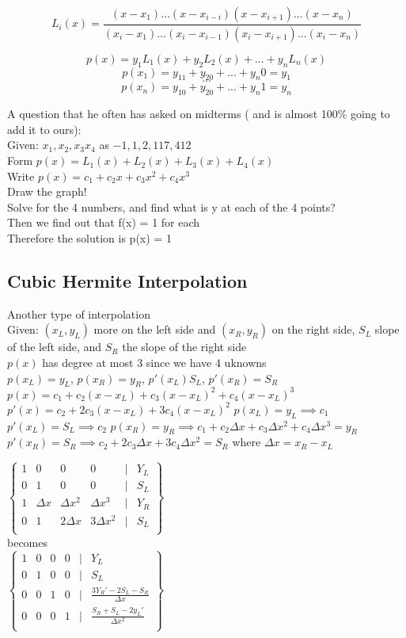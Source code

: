 \documentclass[12pt]{article}
\begin{document}
	$$L_i(x) = \frac{(x-x_1)...(x-x_{i-i})(x-x_{i+1})...(x-x_n)}{(x_i-x_1)...(x_i-x_{i-1})(x_i-x_{i+1})...(x_i-x_n)}$$
	
	$$p(x) = y_1L_1(x) + y_2L_2(x) + ... + y_nL_n(x)$$
	$$p(x_1) = y_11 + y_20 + ... + y_n0 = y_1$$
	$$...$$
	$$p(x_n) = y_10 + y_20 + ... + y_n1 = y_n$$
	
	A question that he often has asked on midterms ( and is almost 100\% going to add it to ours):\\
	Given: $x_1,x_2,x_3x_4$ as $-1,1,2,117,412$\\
	Form $p(x) = L_1(x) + L_2(x) + L_3(x) + L_4(x)$\\
	Write $p(x) = c_1 + c_2x + c_3x^2 + c_4x^3$\\
	
	Draw the graph!\\
	Solve for the 4 numbers, and find what is y at each of the 4 points?\\
	Then we find out that f(x) = 1 for each\\
	Therefore the solution is p(x) = 1\\
	
	\subsection*{Cubic Hermite Interpolation}
	Another type of interpolation\\
	
	Given: $(x_L, y_L)$ more on the left side and $(x_R, y_R)$ on the right side, $S_L$ slope of the left side, and $S_R$ the slope of the right side\\
	
	$p(x)$ has degree at most 3 since we have 4 uknowns\\
	$p(x_L) = y_L$, $p(x_R) = y_R$, $p'(x_L) S_L$, $p'(x_R) = S_R$\\
	
	$p(x) = c_1 + c_2(x-x_L) + c_3(x-x_L)^2 + c_4(x-x_L)^3$
	$p'(x) = c_2 + 2c_3(x-x_L) + 3c_4(x-x_L)^2$
	$p(x_L) = y_L \implies c_1$
	$p'(x_L) = S_L \implies c_2$
	$p(x_R) = y_R \implies c_1 + c_2\Delta x + c_3\Delta x^2 + c_4 \Delta x^3 = y_R$
	$p'(x_R) = S_R \implies c_2 + 2c_3\Delta x + 3c_4\Delta x^2 = S_R$
	where $\Delta x = x_R - x_L$
	
	$
	\begin{Bmatrix}
	 1 & 0 & 0 & 0 & | & Y_L \\
	 0 & 1 & 0 & 0 & | & S_L \\
	 1 & \Delta x & \Delta x^2 & \Delta x^3 & | & Y_R \\
	 0 & 1 & 2\Delta x & 3\Delta x^2 & | & S_L \\
	\end{Bmatrix}
	$\\
	becomes\\ 	
	$
	\begin{Bmatrix}
	1 & 0 & 0 & 0 & | & Y_L \\
	0 & 1 & 0 & 0 & | & S_L \\
	0 & 0 & 1 & 0 & | & \frac{3Y_R' - 2S_L - S_R}{\Delta x} \\
	0 & 0 & 0 & 1 & | & \frac{S_R + S_L - 2y_L'}{\Delta x^2} \\
	\end{Bmatrix}
	$
	
\end{document}
